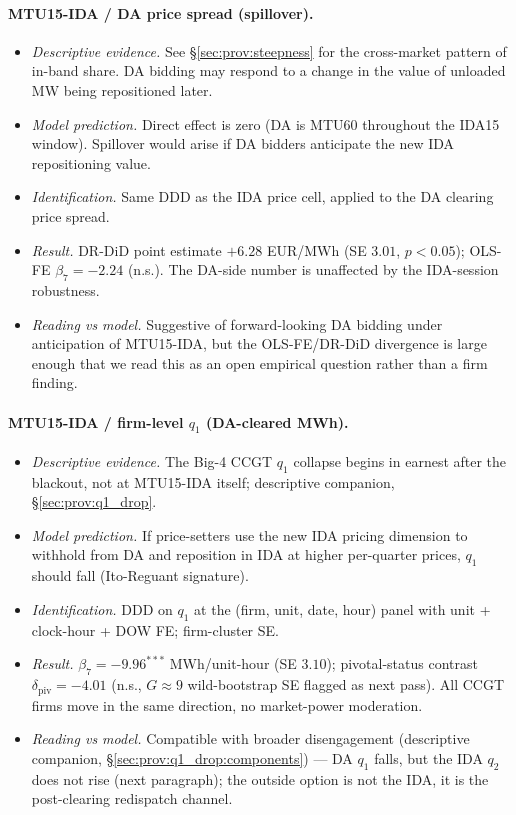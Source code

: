 \documentclass[11pt,a4paper]{article}
\begin{document}
\paragraph{MTU15-IDA / DA price spread (spillover).}
\begin{itemize}
\item \emph{Descriptive evidence.} See \S\ref{sec:prov:steepness} for the cross-market pattern of in-band share. DA bidding may respond to a change in the value of unloaded MW being repositioned later.
\item \emph{Model prediction.} Direct effect is zero (DA is MTU60 throughout the IDA15 window). Spillover would arise if DA bidders anticipate the new IDA repositioning value.
\item \emph{Identification.} Same DDD as the IDA price cell, applied to the DA clearing price spread.
\item \emph{Result.} DR-DiD point estimate $+6.28$ EUR/MWh (SE $3.01$, $p < 0.05$); OLS-FE $\beta_7 = -2.24$ (n.s.). The DA-side number is unaffected by the IDA-session robustness.
\item \emph{Reading vs model.} Suggestive of forward-looking DA bidding under anticipation of MTU15-IDA, but the OLS-FE/DR-DiD divergence is large enough that we read this as an open empirical question rather than a firm finding.
\end{itemize}

\paragraph{MTU15-IDA / firm-level $q_1$ (DA-cleared MWh).}
\begin{itemize}
\item \emph{Descriptive evidence.} The Big-4 CCGT $q_1$ collapse begins in earnest after the blackout, not at MTU15-IDA itself; descriptive companion, \S\ref{sec:prov:q1_drop}.
\item \emph{Model prediction.} If price-setters use the new IDA pricing dimension to withhold from DA and reposition in IDA at higher per-quarter prices, $q_1$ should fall (Ito-Reguant signature).
\item \emph{Identification.} DDD on $q_1$ at the (firm, unit, date, hour) panel with unit + clock-hour + DOW FE; firm-cluster SE.
\item \emph{Result.} $\beta_7 = -9.96^{***}$ MWh/unit-hour (SE $3.10$); pivotal-status contrast $\delta_{\text{piv}} = -4.01$ (n.s., $G \approx 9$ wild-bootstrap SE flagged as next pass). All CCGT firms move in the same direction, no market-power moderation.
\item \emph{Reading vs model.} Compatible with broader disengagement (descriptive companion, \S\ref{sec:prov:q1_drop:components}) --- DA $q_1$ falls, but the IDA $q_2$ does not rise (next paragraph); the outside option is not the IDA, it is the post-clearing redispatch channel.
\end{itemize}
\end{document}
